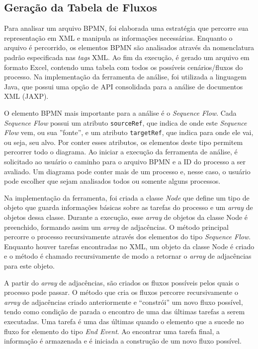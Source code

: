 \documentclass[12pt]{article}
\begin{document}

\subsection{Geração da Tabela de Fluxos}

Para analisar um arquivo BPMN, foi elaborada uma estratégia que percorre sua representação em XML e manipula as informações necessárias. Enquanto o arquivo é percorrido, os elementos BPMN são analisados através da nomenclatura padrão especificada nas \emph{tags} XML. Ao fim da execução, é gerado um arquivo em formato Excel, contendo uma tabela com todos os possíveis cenários/fluxos do processo. Na implementação da ferramenta de análise, foi utilizada a linguagem Java, que possui uma opção de API consolidada para a análise de documentos XML (JAXP).

O elemento BPMN mais importante para a análise é o \emph{Sequence Flow}. Cada \emph{Sequence Flow} possui um atributo \texttt{sourceRef}, que indica de onde este \emph{Sequence Flow} vem, ou sua ''fonte'', e um atributo \texttt{targetRef}, que indica para onde ele vai, ou seja, seu alvo. Por conter esses atributos, os elementos deste tipo permitem percorrer todo o diagrama. Ao iniciar a execução da ferramenta de análise, é solicitado ao usuário o caminho para o arquivo BPMN e a ID do processo a ser avaliado. Um diagrama pode conter mais de um processo e, nesse caso, o usuário pode escolher que sejam analisados todos ou somente alguns processos.

Na implementação da ferramenta, foi criada a classe \emph{Node} que define um tipo de objeto que guarda informações básicas sobre as tarefas do processo e um \emph{array} de objetos dessa classe. Durante a execução, esse \emph{array} de objetos da classe Node é preenchido, formando assim um \emph{array} de adjacências. O método principal percorre o processo recursivamente através dos elementos do tipo \emph{Sequence Flow}. Enquanto houver tarefas encontradas no XML, um objeto da classe Node é criado e o método é chamado recursivamente de modo a retornar o \emph{array} de adjacências para este objeto.

A partir do \emph{array} de adjacências, são criados os fluxos possíveis pelos quais o processo pode passar. O método que cria os fluxos percorre recursivamente o \emph{array} de adjacências criado anteriormente e ``constrói'' um novo fluxo possível, tendo como condição de parada o encontro de uma das últimas tarefas a serem executadas. Uma tarefa é uma das últimas quando o elemento que a sucede no fluxo for elemento do tipo \emph{End Event}. Ao encontrar uma tarefa final, a informação é armazenada e é iniciada a construção de um novo fluxo possível.
\end{document}
